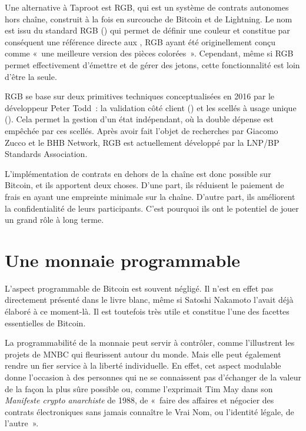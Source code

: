 Une alternative à Taproot est RGB, qui est un système de contrats autonomes hors chaîne, construit à la fois en surcouche de Bitcoin et de Lightning. Le nom est issu du standard RGB () qui permet de définir une couleur et constitue par conséquent une référence directe aux , RGB ayant été originellement conçu comme «~une meilleure version des pièces colorées~». Cependant, même si RGB permet effectivement d'émettre et de gérer des jetons, cette fonctionnalité est loin d'être la seule.

RGB se base sur deux primitives techniques conceptualisées en 2016 par le développeur Peter Todd~: la validation côté client () et les scellés à usage unique (). Cela permet la gestion d'un état indépendant, où la double dépense est empêchée par ces scellés. Après avoir fait l'objet de recherches par Giacomo Zucco et le BHB Network, RGB est actuellement développé par la LNP/BP Standards Association.

L'implémentation de contrats en dehors de la chaîne est donc possible sur Bitcoin, et ils apportent deux choses. D'une part, ils réduisent le paiement de frais en ayant une empreinte minimale sur la chaîne. D'autre part, ils améliorent la confidentialité de leurs participants. C'est pourquoi ils ont le potentiel de jouer un grand rôle à long terme.

\section*{Une monnaie programmable}

L'aspect programmable de Bitcoin est souvent négligé. Il n'est en effet pas directement présenté dans le livre blanc, même si Satoshi Nakamoto l'avait déjà élaboré à ce moment-là. Il est toutefois très utile et constitue l'une des facettes essentielles de Bitcoin.

La programmabilité de la monnaie peut servir à contrôler, comme l'illustrent les projets de MNBC qui fleurissent autour du monde. Mais elle peut également rendre un fier service à la liberté individuelle. En effet, cet aspect modulable donne l'occasion à des personnes qui ne se connaissent pas d'échanger de la valeur de la façon la plus sûre possible ou, comme l'exprimait Tim May dans son \emph{Manifeste crypto anarchiste} de 1988, de «~faire des affaires et négocier des contrats électroniques sans jamais connaître le Vrai Nom, ou l'identité légale, de l'autre~».


